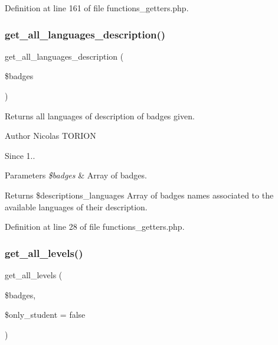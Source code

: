 Definition at line 161 of file functions\+\_\+getters.\+php.

\mbox{\label{functions__getters_8php_a3cdd298c6d6686cbbc3c2d0510a87eec}} 
\subsubsection{\texorpdfstring{get\+\_\+all\+\_\+languages\+\_\+description()}{get\_all\_languages\_description()}}
{\footnotesize\ttfamily get\+\_\+all\+\_\+languages\+\_\+description (\begin{DoxyParamCaption}\item[{}]{\$badges }\end{DoxyParamCaption})}

Returns all languages of description of badges given.

\begin{DoxyAuthor}{Author}
Nicolas T\+O\+R\+I\+ON 
\end{DoxyAuthor}
\begin{DoxySince}{Since}
1.. 
\end{DoxySince}

\begin{DoxyParams}{Parameters}
{\em \$badges} & Array of badges. \\
\hline
\end{DoxyParams}
\begin{DoxyReturn}{Returns}
\$descriptions\+\_\+languages Array of badges names associated to the available languages of their description. 
\end{DoxyReturn}


Definition at line 28 of file functions\+\_\+getters.\+php.

\mbox{\label{functions__getters_8php_a09f10d63f6129341de45d8fd52fb6afa}} 
\subsubsection{\texorpdfstring{get\+\_\+all\+\_\+levels()}{get\_all\_levels()}}
{\footnotesize\ttfamily get\+\_\+all\+\_\+levels (\begin{DoxyParamCaption}\item[{}]{\$badges,  }\item[{}]{\$only\+\_\+student = {\ttfamily false} }\end{DoxyParamCaption})}

